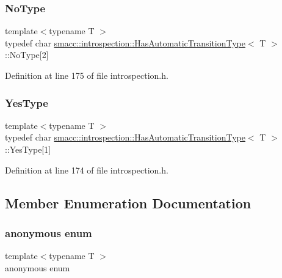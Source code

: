 \subsubsection{\texorpdfstring{No\+Type}{NoType}}
{\footnotesize\ttfamily template$<$typename T $>$ \\
typedef char \hyperlink{classsmacc_1_1introspection_1_1HasAutomaticTransitionType}{smacc\+::introspection\+::\+Has\+Automatic\+Transition\+Type}$<$ T $>$\+::No\+Type\mbox{[}2\mbox{]}\hspace{0.3cm}{\ttfamily [private]}}



Definition at line 175 of file introspection.\+h.

\mbox{\label{classsmacc_1_1introspection_1_1HasAutomaticTransitionType_abeb599df547eb3db36684b6cb343eade}} 
\subsubsection{\texorpdfstring{Yes\+Type}{YesType}}
{\footnotesize\ttfamily template$<$typename T $>$ \\
typedef char \hyperlink{classsmacc_1_1introspection_1_1HasAutomaticTransitionType}{smacc\+::introspection\+::\+Has\+Automatic\+Transition\+Type}$<$ T $>$\+::Yes\+Type\mbox{[}1\mbox{]}\hspace{0.3cm}{\ttfamily [private]}}



Definition at line 174 of file introspection.\+h.



\subsection{Member Enumeration Documentation}
\mbox{\label{classsmacc_1_1introspection_1_1HasAutomaticTransitionType_ac663d77745eac0f2b2ceb29e4c8b300b}} 
\subsubsection{\texorpdfstring{anonymous enum}{anonymous enum}}
{\footnotesize\ttfamily template$<$typename T $>$ \\
anonymous enum}

